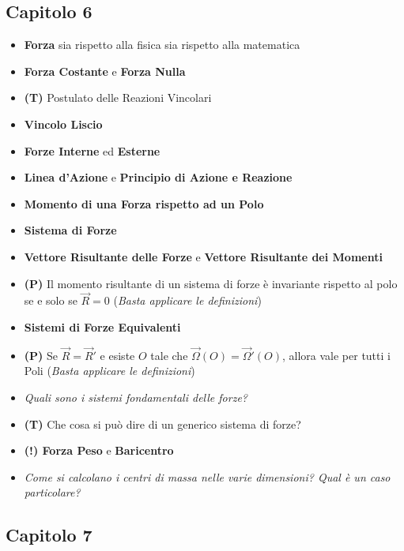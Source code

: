 \documentclass[11pt,a4paper,twoside]{article}
\begin{document}
\subsection*{Capitolo 6}
\begin{itemize}
	\item \textbf{Forza} sia rispetto alla fisica sia rispetto alla matematica
	\item \textbf{Forza Costante} e \textbf{Forza Nulla}
	\item \textbf{(T)} Postulato delle Reazioni Vincolari
	\item \textbf{Vincolo Liscio}
	\item \textbf{Forze Interne} ed \textbf{Esterne}
	\item \textbf{Linea d'Azione} e \textbf{Principio di Azione e Reazione}
	\item \textbf{Momento di una Forza rispetto ad un Polo}
	\item \textbf{Sistema di Forze}
	\item \textbf{Vettore Risultante delle Forze} e \textbf{Vettore Risultante dei Momenti}
	\item \textbf{(P)} Il momento risultante di un sistema di forze è invariante rispetto al polo se e solo se $\vec R=0$ (\textit{Basta applicare le definizioni})
	\item \textbf{Sistemi di Forze Equivalenti}
	\item \textbf{(P)} Se $\vec R = \vec R'$ e esiste $O$ tale che $\vec \Omega(O)= \vec \Omega'(O)$, allora vale per tutti i Poli (\textit{Basta applicare le definizioni})
	\item \textit{Quali sono i sistemi fondamentali delle forze?}
	\item \textbf{(T)} Che cosa si può dire di un generico sistema di forze?
	\item \textbf{(!) Forza Peso} e \textbf{Baricentro}
	\item \textit{Come si calcolano i centri di massa nelle varie dimensioni? Qual è un caso particolare?}
\end{itemize}

\subsection*{Capitolo 7}
\end{document}
